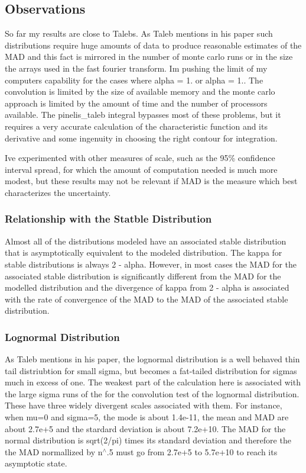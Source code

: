 \subsection*{Observations}

So far my results are close to Taleb\textquotesingle{}s. As Taleb mentions in his paper such distributions require huge amounts of data to produce reasonable estimates of the M\+AD and this fact is mirrored in the number of monte carlo runs or in the size the arrays used in the fast fourier transform. I\textquotesingle{}m pushing the limit of my computer\textquotesingle{}s capability for the cases where alpha = 1. or alpha = 1.. The convolution is limited by the size of available memory and the monte carlo approach is limited by the amount of time and the number of processors available. The pinelis\+\_\+taleb integral bypasses most of these problems, but it requires a very accurate calculation of the characteristic function and its derivative and some ingenuity in choosing the right contour for integration.

I\textquotesingle{}ve experimented with other measures of scale, such as the 95\% confidence interval spread, for which the amount of computation needed is much more modest, but these results may not be relevant if M\+AD is the measure which best characterizes the uncertainty.

\subsubsection*{Relationship with the Statble Distribution}

Almost all of the distributions modeled have an associated stable distribution that is asymptotically equivalent to the modeled distribution. The kappa for stable distributions is always 2 -\/ alpha. However, in most cases the M\+AD for the associated stable distribution is significantly different from the M\+AD for the modelled distribution and the divergence of kappa from 2 -\/ alpha is associated with the rate of convergence of the M\+AD to the M\+AD of the associated stable distribution.

\subsubsection*{Lognormal Distribution}

As Taleb mentions in his paper, the lognormal distribution is a well behaved thin tail distriubtion for small sigma, but becomes a fat-\/tailed distribution for sigmas much in excess of one. The weakest part of the calculation here is associated with the large sigma runs of the for the convolution test of the lognormal distribution. These have three widely divergent scales associated with them. For instance, when mu=0 and sigma=5, the mode is about 1.\+4e-\/11, the mean and M\+AD are about 2.\+7e+5 and the stardard deviation is about 7.\+2e+10. The M\+AD for the normal distribution is sqrt(2/pi) times it\textquotesingle{}s standard deviation and therefore the the M\+AD normallized by n$^\wedge$.5 must go from 2.\+7e+5 to 5.\+7e+10 to reach it\textquotesingle{}s asymptotic state.

